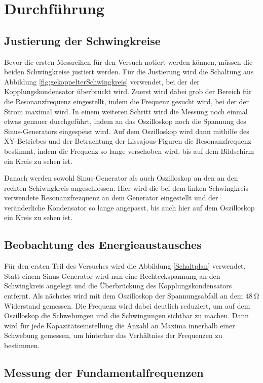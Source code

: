 \section{Durchführung}

\subsection{Justierung der Schwingkreise}

Bevor die ersten Messreihen für den Versuch notiert werden können, müssen die beiden
Schwingkreise justiert werden. Für die Justierung wird die Schaltung aus Abbildung \ref{fig:gekoppelterSchwingkreis}
verwendet, bei der der Kopplungskondensator überbrückt wird. Zuerst wird dabei
grob der Bereich für die Resonanzfrequenz eingestellt,
indem die Frequenz gesucht wird, bei der der Strom maximal wird. In einem weiteren
Schritt wird die Messung noch einmal etwas genauer durchgeführt, indem an das
Oszilloskop noch die Spannung des Sinus-Generators eingespeist wird. Auf dem Oszilloskop
wird dann mithilfe des XY-Betriebes und der Betrachtung der Lissajous-Figuren die
Resonanzfrequenz bestimmt, indem die Frequenz so lange verschoben wird, bis auf
dem Bildschirm ein Kreis zu sehen ist.

Danach werden sowohl Sinus-Generator als
auch Oszilloskop an den an den rechten Schiwngkreis angeschlossen. Hier wird die
bei dem linken Schwingkreis verwendete Resonanzfrezquenz an dem Generator eingestellt
und der veränderliche Kondensator so lange angepasst, bis auch hier auf dem Oszilloskop
ein Kreis zu sehen ist.

\subsection{Beobachtung des Energieaustausches}

Für den ersten Teil des Versuches wird die Abbildung \ref{Schaltplan} verwendet. Statt einem
Sinus-Generator wird nun eine Rechteckspannung an den Schwingkreis angelegt und
die Überbrückung des Kopplungskondensators entfernt. Als nächstes wird mit dem
Oszilloskop der Spannungsabfall an dem $\SI{48}{\ohm}$ Widerstand gemessen.
Die Frequenz wird dabei deutlich reduziert, um auf dem Oszilloskop
die Schwebungen und die Schwingungen sichtbar zu machen.
Dann wird für jede Kapazitätseinstellung die Anzahl an Maxima innerhalb einer
Schwebung gemessen, um hinterher das Verhältniss der Frequenzen zu bestimmen.

\subsection{Messung der Fundamentalfrequenzen}

